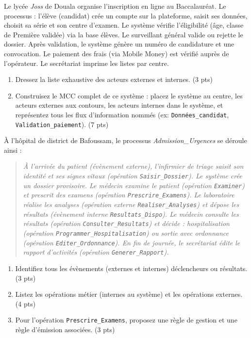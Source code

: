 \documentclass[11pt]{article}
\begin{document}
\begin{exercice}
Le lycée \textit{Joss} de Douala organise l'inscription en ligne au Baccalauréat. Le processus : l'élève (candidat) crée un compte sur la plateforme, saisit ses données, choisit sa série et son centre d'examen. Le système vérifie l'éligibilité (âge, classe de Première validée) via la base élèves. Le surveillant général valide ou rejette le dossier. Après validation, le système génère un numéro de candidature et une convocation. Le paiement des frais (via Mobile Money) est vérifié auprès de l'opérateur. Le secrétariat imprime les listes par centre.
\begin{enumerate}
    \item Dressez la liste exhaustive des acteurs externes et internes. (3 pts)
    \item Construisez le MCC complet de ce système : placez le système au centre, les acteurs externes aux contours, les acteurs internes dans le système, et représentez tous les flux d'information nommés (ex: \texttt{Données\_candidat}, \texttt{Validation\_paiement}). (7 pts)
\end{enumerate}
\end{exercice}

\begin{exercice}
À l'hôpital de district de Bafoussam, le processus \textit{Admission\_Urgences} se déroule ainsi : 
\begin{quote}
\textit{À l'arrivée du patient (évènement externe), l'infirmier de triage saisit son identité et ses signes vitaux (opération \texttt{Saisir\_Dossier}). Le système crée un dossier provisoire. Le médecin examine le patient (opération \texttt{Examiner}) et prescrit des examens (opération \texttt{Prescrire\_Examens}). Le laboratoire réalise les analyses (opération externe \texttt{Realiser\_Analyses}) et dépose les résultats (évènement interne \texttt{Resultats\_Dispo}). Le médecin consulte les résultats (opération \texttt{Consulter\_Resultats}) et décide : hospitalisation (opération \texttt{Programmer\_Hospitalisation}) ou sortie avec ordonnance (opération \texttt{Editer\_Ordonnance}). En fin de journée, le secrétariat édite le rapport d'activités (opération \texttt{Generer\_Rapport}).}
\end{quote}
\begin{enumerate}
    \item Identifiez tous les évènements (externes et internes) déclencheurs ou résultats. (3 pts)
    \item Listez les opérations métier (internes au système) et les opérations externes. (4 pts)
    \item Pour l'opération \texttt{Prescrire\_Examens}, proposez une règle de gestion et une règle d'émission associées. (3 pts)
\end{enumerate}
\end{exercice}
\end{document}

